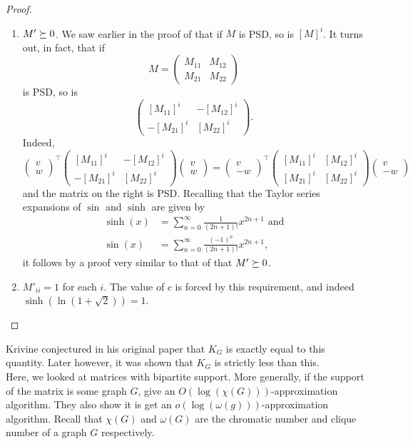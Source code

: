 \begin{proof}
\begin{enumerate}[label=(\alph*)]
			\item $M' \succeq 0$. We saw earlier in the proof of  that if $M$ is PSD, so is $[M]^i$. It turns out, in fact, that if
			\[ M = \begin{pmatrix} M_{11} & M_{12} \\ M_{21} & M_{22} \end{pmatrix} \]
			is PSD, so is
			\[ \begin{pmatrix} [M_{11}]^i & -[M_{12}]^i \\ -[M_{21}]^i & [M_{22}]^i \end{pmatrix}. \]
			Indeed,
			\[ \begin{pmatrix} v \\ w \end{pmatrix}^\top \begin{pmatrix} [M_{11}]^i & -[M_{12}]^i \\ -[M_{21}]^i & [M_{22}]^i \end{pmatrix} \begin{pmatrix} v \\ w \end{pmatrix} = \begin{pmatrix} v \\ -w \end{pmatrix}^\top \begin{pmatrix} [M_{11}]^i & [M_{12}]^i \\ [M_{21}]^i & [M_{22}]^i \end{pmatrix} \begin{pmatrix} v \\ -w \end{pmatrix} \]
			and the matrix on the right is PSD.
			Recalling that the Taylor series expansions of $\sin$ and $\sinh$ are given by
			\begin{align*}
				\sinh(x) &= \sum_{n=0}^{\infty} \frac{1}{(2n+1)!} x^{2n+1} \text{ and} \\
				\sin(x) &= \sum_{n=0}^{\infty} \frac{(-1)^n}{(2n+1)!} x^{2n+1},
			\end{align*}
			it follows by a proof very similar to that of  that $M' \succeq 0$.
			\item $M'_{ii} = 1$ for each $i$. The value of $c$ is forced by this requirement, and indeed $\sinh(\ln(1+\sqrt{2})) = 1$. \qedhere
		\end{enumerate}
	\end{proof}

	Krivine conjectured in his original paper that $K_G$ is exactly equal to this quantity. Later however, it was shown \cite{braverman-krivine} that $K_G$ is strictly less than this.\\

	Here, we looked at matrices with bipartite support. More generally, if the support of the matrix is some graph $G$, \cite{generalized-grothendieck-graph-supp} give an $O(\log(\chi(G)))$-approximation algorithm. They also show it is get an $o(\log(\omega(g)))$-approximation algorithm. Recall that $\chi(G)$ and $\omega(G)$ are the chromatic number and clique number of a graph $G$ respectively.